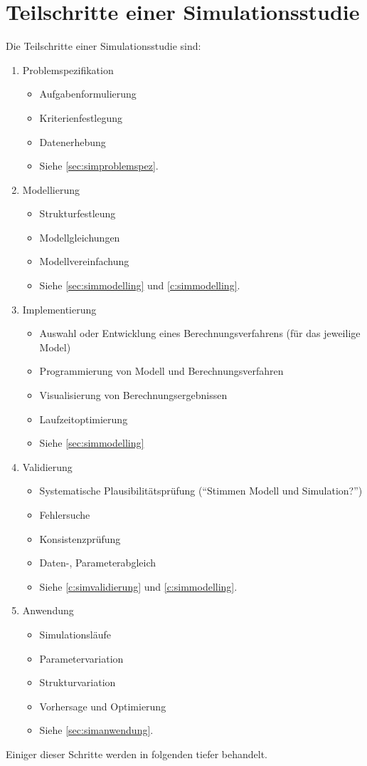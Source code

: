\chapter{Teilschritte einer Simulationsstudie} %
	Die Teilschritte einer Simulationsstudie sind:
	\begin{enumerate}
		\item Problemspezifikation
			\begin{itemize}
				\item Aufgabenformulierung
				\item Kriterienfestlegung
				\item Datenerhebung
				\item Siehe \ref{sec:simproblemspez}.
			\end{itemize}
		\item Modellierung
			\begin{itemize}
				\item Strukturfestleung
				\item Modellgleichungen
				\item Modellvereinfachung
				\item Siehe \ref{sec:simmodelling} und \ref{c:simmodelling}.
			\end{itemize}
		\item Implementierung
			\begin{itemize}
				\item Auswahl oder Entwicklung eines Berechnungsverfahrens (für das jeweilige Model)
				\item Programmierung von Modell und Berechnungsverfahren
				\item Visualisierung von Berechnungsergebnissen
				\item Laufzeitoptimierung
				\item Siehe \ref{sec:simmodelling}
			\end{itemize}
		\item Validierung
			\begin{itemize}
				\item Systematische Plausibilitätsprüfung (\enquote{Stimmen Modell und Simulation?})
				\item Fehlersuche
				\item Konsistenzprüfung
				\item Daten-, Parameterabgleich
				\item Siehe \ref{c:simvalidierung} und \ref{c:simmodelling}.
			\end{itemize}
		\item Anwendung
			\begin{itemize}
				\item Simulationsläufe
				\item Parametervariation
				\item Strukturvariation
				\item Vorhersage und Optimierung
				\item Siehe \ref{sec:simanwendung}.
			\end{itemize}
	\end{enumerate}
	Einiger dieser Schritte werden in folgenden tiefer behandelt.

